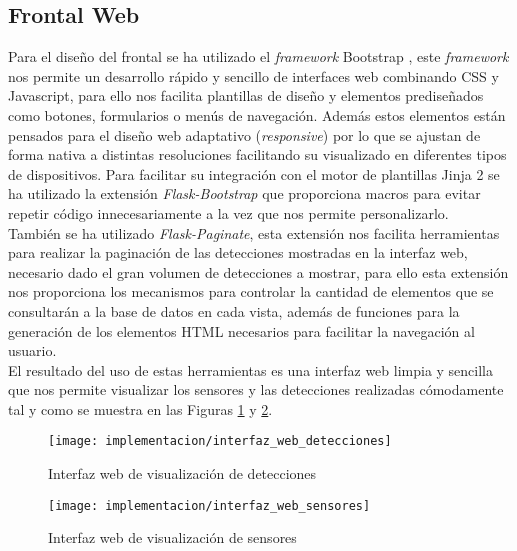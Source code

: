 \documentclass[../proyecto.tex]{subfiles}
\begin{document}
{{{\medskip

\subsection{Frontal Web}

Para el diseño del frontal se  ha utilizado el \textit{framework} Bootstrap \cite{bootstrap_frontend_framework}, este \textit{framework} nos permite un desarrollo rápido y sencillo de interfaces web combinando CSS y Javascript, para ello nos facilita plantillas de diseño y elementos prediseñados como botones, formularios o menús de navegación. Además estos elementos están pensados para el diseño web adaptativo (\textit{responsive}) por lo que se ajustan de forma nativa a distintas resoluciones facilitando su visualizado en diferentes tipos de dispositivos. Para facilitar su integración con el motor de plantillas Jinja 2 se ha utilizado la extensión \textit{Flask-Bootstrap} \cite{flask_bootstrap} que proporciona macros para evitar repetir código innecesariamente a la vez que nos permite personalizarlo.\\

También se ha utilizado \textit{Flask-Paginate}, esta extensión nos facilita herramientas para realizar la paginación de las detecciones mostradas en la interfaz web, necesario dado el gran volumen de detecciones a mostrar, para ello esta extensión nos proporciona los mecanismos para controlar la cantidad de elementos que se consultarán a la base de datos en cada vista, además de funciones para la generación de los elementos HTML necesarios para facilitar la navegación al usuario. \\

El resultado del uso de estas herramientas es una interfaz web limpia y sencilla que nos permite visualizar los sensores y las detecciones realizadas cómodamente tal y como se muestra en las Figuras \ref{fig:interfaz_web_detecciones} y \ref{fig:interfaz_web_sensores}.\\

\begin{figure}[H]
\centering
\texttt{[image: implementacion/interfaz\_web\_detecciones]}
\caption{Interfaz web de visualización de detecciones}
\label{fig:interfaz_web_detecciones}
\end{figure}

\begin{figure}[H]
\centering
\texttt{[image: implementacion/interfaz\_web\_sensores]}
\caption{Interfaz web de visualización de sensores}
\label{fig:interfaz_web_sensores}
\end{figure}

}}}
\end{document}
